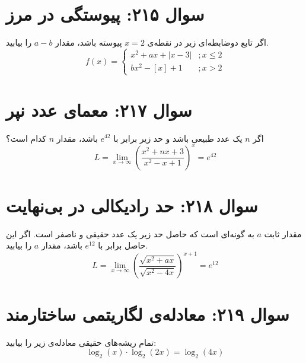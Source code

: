 \documentclass[12pt]{article}
\begin{document}
\section*{سوال ۲۱۵: پیوستگی در مرز}
اگر تابع دوضابطه‌ای زیر در نقطه‌ی \(x=2\) پیوسته باشد، مقدار \(a-b\) را بیابید.
\begin{displaymath}
	f(x) = 
	\begin{cases}
		x^2 + ax + |x-3| & ; x \le 2 \\
		bx^2 - [x] + 1 & ; x > 2
	\end{cases}
\end{displaymath}

\section*{سوال ۲۱۷: معمای عدد نپر}
اگر \(n\) یک عدد طبیعی باشد و حد زیر برابر با \(e^{42}\) باشد، مقدار \(n\) کدام است؟
\begin{displaymath}
	L = \lim_{x \to \infty} \left( \frac{x^2+nx+3}{x^2-x+1} \right)^{x} = e^{42}
\end{displaymath}

\section*{سوال ۲۱۸: حد رادیکالی در بی‌نهایت}
مقدار ثابت \(a\) به گونه‌ای است که حاصل حد زیر یک عدد حقیقی و ناصفر است. اگر این حاصل برابر با \(e^{12}\) باشد، مقدار \(a\) را بیابید.
\begin{displaymath}
	L = \lim_{x \to \infty} \left( \frac{\sqrt{x^2+ax}}{\sqrt{x^2-4x}} \right)^{x+1} = e^{12}
\end{displaymath}

\section*{سوال ۲۱۹: معادله‌ی لگاریتمی ساختارمند}
تمام ریشه‌های حقیقی معادله‌ی زیر را بیابید:
\begin{displaymath}
	\log_2(x) \cdot \log_2(2x) = \log_2(4x)
\end{displaymath}
\end{document}
